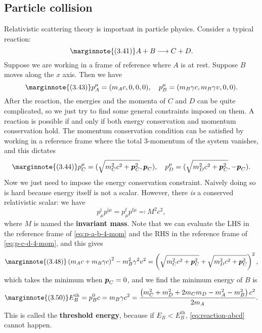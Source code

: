 \documentclass[hyperref, a4paper]{article}
\newcommand*{\concept}[1]{{\textbf{#1}}}
\begin{document}
\subsection{Particle collision}

Relativistic scattering theory is important in particle physics. Consider a typical reaction:
\begin{equation} \marginnote{(3.41)}
    A + B \longrightarrow C + D.
    \label{eq:reaction-abcd}
\end{equation}
Suppose we are working in a frame of reference where $A$ is at rest. Suppose $B$ moves along the $x$ axis.
Then we have 
\begin{equation} \marginnote{(3.43)}
    p_A^\mu = (m_A c, 0, 0, 0), \quad p_B^\mu = (m_B \gamma c, m_B \gamma v, 0, 0).
    \label{eq:p-a-b-4-mom}
\end{equation}
After the reaction, the energies and the momenta of $C$ and $D$ can be quite complicated, so we just 
try to find some general constraints imposed on them. A reaction is possible if and only if both 
energy conservation and momentum conservation hold. The momentum conservation condition can be 
satisfied by working in a reference frame where the total 3-momentum of the system vanishes, and 
this dictates 
\begin{equation} \marginnote{(3.44)}
    p_C^\mu = (\sqrt{m_C^2 c^2 + \vb*{p}_C^2}, \vb*{p}_C), \quad p_D^\mu = (\sqrt{m_D^2 c^2 + \vb*{p}_C^2}, - \vb*{p}_C).
    \label{eq:p-c-d-4-mom}
\end{equation}
Now we just need to impose the energy conservation constraint. Naively doing so is hard because energy itself 
is not a scalar. However, there \emph{is} a conserved relativistic scalar: we have  
\begin{equation}
    p^\text{i}_\mu p^{\text{i} \mu} = p^\text{f}_\mu p^{\text{f} \mu} \eqqcolon M^2 c^2,
\end{equation}
where $M$ is named the \concept{invariant mass}. Note that we can evaluate the LHS in the reference frame of 
\eqref{eq:p-a-b-4-mom} and the RHS in the reference frame of \eqref{eq:p-c-d-4-mom}, and this gives 
\begin{equation} \marginnote{(3.48)}
    \left(m_{A} c+m_{B} \gamma c\right)^{2}-m_{B}^{2} \gamma^{2} v^{2}=\left( \sqrt{m_C^2 c^2 + \vb*{p}_C^2} + \sqrt{m_D^2 c^2 + \vb*{p}_C^2} \right)^{2} ,
\end{equation}
which takes the minimum when $\vb*{p}_C = 0$, and we find the minimum energy of $B$ is 
\begin{equation} \marginnote{(3.50)}
    E_B^\text{th} = p_B^0 c = m_B \gamma c^2 = \frac{\left(m_{C}^{2}+m_{D}^{2}+2 m_{C} m_{D}-m_{A}^{2}-m_{B}^{2}\right) c^{2}}{2 m_{A}}.
\end{equation}
This is called the \concept{threshold energy}, because if $E_B < E_B^\text{th}$, \eqref{eq:reaction-abcd} cannot happen.
\end{document}
